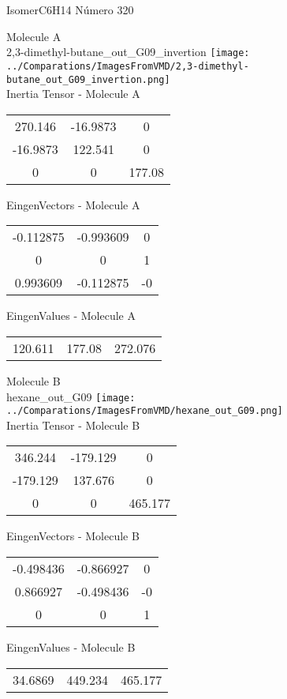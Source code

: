 \vtab[-2cm]
\begin{center}
{\large IsomerC6H14 \tab Número 320}
\end{center}
\begin{multicols}{2}
\begin{center}

Molecule A \\ 
2,3-dimethyl-butane\_out\_G09\_invertion
\texttt{[image: ../Comparations/ImagesFromVMD/2,3-dimethyl-butane\_out\_G09\_invertion.png]}
\\
Inertia Tensor - Molecule A \\
\vtab

\begin{tabular}{|c c c|}
270.146	 & 	-16.9873	 & 	0	 \\
-16.9873	 & 	122.541	 & 	0	 \\
0	 & 	0	 & 	177.08
\end{tabular}

\vtab
 EingenVectors - Molecule A     \\
\vtab
\begin{tabular}{|c c c|}
-0.112875	 & 	-0.993609	 & 	0	 \\
0	 & 	0	 & 	1	 \\
0.993609	 & 	-0.112875	 & 	-0
\end{tabular}

\vtab
 EingenValues - Molecule A     \\
\vtab
\begin{tabular}{|c c c|}
120.611	 & 	177.08	 & 	272.076	 \\
\end{tabular}
\columnbreak

Molecule B \\ 
hexane\_out\_G09
\texttt{[image: ../Comparations/ImagesFromVMD/hexane\_out\_G09.png]}
\\
Inertia Tensor - Molecule B \\
\vtab

\begin{tabular}{|c c c|}
346.244	 & 	-179.129	 & 	0	 \\
-179.129	 & 	137.676	 & 	0	 \\
0	 & 	0	 & 	465.177
\end{tabular}

\vtab
 EingenVectors - Molecule B     \\
\vtab
\begin{tabular}{|c c c|}
-0.498436	 & 	-0.866927	 & 	0	 \\
0.866927	 & 	-0.498436	 & 	-0	 \\
0	 & 	0	 & 	1
\end{tabular}

\vtab
 EingenValues - Molecule B     \\
\vtab
\begin{tabular}{|c c c|}
34.6869	 & 	449.234	 & 	465.177	 \\
\end{tabular}

\end{center}
\end{multicols}
